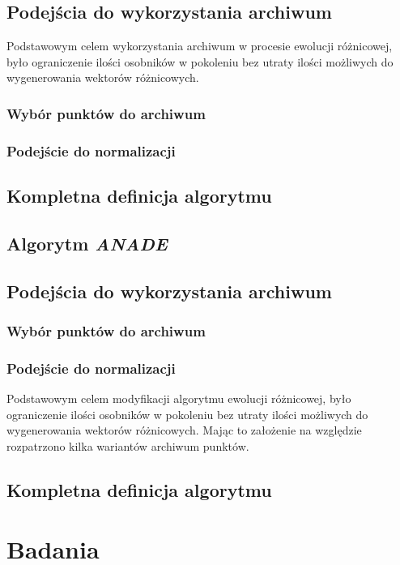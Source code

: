 \documentclass[12pt,a4paper]{report}
\begin{document}
{{{{\section{Podejścia do wykorzystania archiwum}
\par{
Podstawowym celem wykorzystania archiwum w procesie ewolucji różnicowej, było ograniczenie ilości osobników w pokoleniu bez utraty ilości możliwych do wygenerowania wektorów różnicowych.
}
\subsection{Wybór punktów do archiwum}
\subsection{Podejście do normalizacji}


\section{Kompletna definicja algorytmu}

\section{Algorytm \emph{ANADE}}
\label{ANADE}
\par{

}
\section{Podejścia do wykorzystania archiwum}
\subsection{Wybór punktów do archiwum}
\subsection{Podejście do normalizacji}

Podstawowym celem modyfikacji algorytmu ewolucji różnicowej, było ograniczenie ilości osobników w pokoleniu bez utraty ilości możliwych do wygenerowania wektorów różnicowych. Mając to założenie na względzie rozpatrzono kilka wariantów archiwum punktów.
\section{Kompletna definicja algorytmu}


\chapter{Badania}
\label{badania}
}}}}
\end{document}
